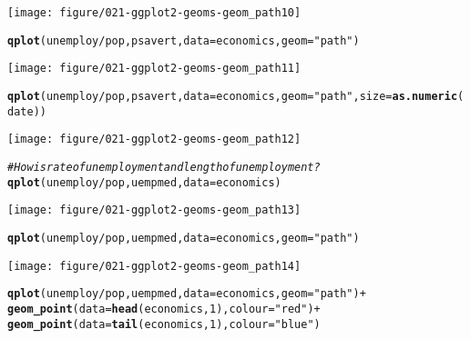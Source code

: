 \documentclass[a4paper,titlepage]{tufte-handout}\usepackage[]{graphicx}\usepackage[]{color}
\makeatletter
\def\maxwidth{ %
  \ifdim\Gin@nat@width>\linewidth
    \linewidth
  \else
    \Gin@nat@width
  \fi
}
\newcommand{\hlnum}[1]{\textcolor[rgb]{0.686,0.059,0.569}{#1}}%
\newcommand{\hlstr}[1]{\textcolor[rgb]{0.192,0.494,0.8}{#1}}%
\newcommand{\hlcom}[1]{\textcolor[rgb]{0.678,0.584,0.686}{\textit{#1}}}%
\newcommand{\hlopt}[1]{\textcolor[rgb]{0,0,0}{#1}}%
\newcommand{\hlstd}[1]{\textcolor[rgb]{0.345,0.345,0.345}{#1}}%
\newcommand{\hlkwc}[1]{\textcolor[rgb]{0.333,0.667,0.333}{#1}}%
\newcommand{\hlkwd}[1]{\textcolor[rgb]{0.737,0.353,0.396}{\textbf{#1}}}%
\newenvironment{kframe}{%
 \def\at@end@of@kframe{}%
 \ifinner\ifhmode%
  \def\at@end@of@kframe{\end{minipage}}%
  \begin{minipage}{\columnwidth}%
 \fi\fi%
 \def\FrameCommand##1{\hskip\@totalleftmargin \hskip-\fboxsep
 \colorbox{shadecolor}{##1}\hskip-\fboxsep
     \hskip-\linewidth \hskip-\@totalleftmargin \hskip\columnwidth}%
 \MakeFramed {\advance\hsize-\width
   \@totalleftmargin\z@ \linewidth\hsize
   \@setminipage}}%
 {\par\unskip\endMakeFramed%
 \at@end@of@kframe}
\newenvironment{knitrout}{}{} %
\makeatother
\begin{document}
\begin{knitrout}
\begin{kframe}
\begin{alltt}
\end{alltt}
\end{kframe}
\texttt{[image: figure/021-ggplot2-geoms-geom\_path10]} 
\begin{kframe}\begin{alltt}
\hlkwd{qplot}\hlstd{(unemploy}\hlopt{/}\hlstd{pop, psavert,} \hlkwc{data}\hlstd{=economics,} \hlkwc{geom}\hlstd{=}\hlstr{"path"}\hlstd{)}
\end{alltt}
\end{kframe}
\texttt{[image: figure/021-ggplot2-geoms-geom\_path11]} 
\begin{kframe}\begin{alltt}
\hlkwd{qplot}\hlstd{(unemploy}\hlopt{/}\hlstd{pop, psavert,} \hlkwc{data}\hlstd{=economics,} \hlkwc{geom}\hlstd{=}\hlstr{"path"}\hlstd{,} \hlkwc{size}\hlstd{=}\hlkwd{as.numeric}\hlstd{(date))}
\end{alltt}
\end{kframe}
\texttt{[image: figure/021-ggplot2-geoms-geom\_path12]} 
\begin{kframe}\begin{alltt}
\hlcom{# How is rate of unemployment and length of unemployment?}
\hlkwd{qplot}\hlstd{(unemploy}\hlopt{/}\hlstd{pop, uempmed,} \hlkwc{data}\hlstd{=economics)}
\end{alltt}
\end{kframe}
\texttt{[image: figure/021-ggplot2-geoms-geom\_path13]} 
\begin{kframe}\begin{alltt}
\hlkwd{qplot}\hlstd{(unemploy}\hlopt{/}\hlstd{pop, uempmed,} \hlkwc{data}\hlstd{=economics,} \hlkwc{geom}\hlstd{=}\hlstr{"path"}\hlstd{)}
\end{alltt}
\end{kframe}
\texttt{[image: figure/021-ggplot2-geoms-geom\_path14]} 
\begin{kframe}\begin{alltt}
\hlkwd{qplot}\hlstd{(unemploy}\hlopt{/}\hlstd{pop, uempmed,} \hlkwc{data}\hlstd{=economics,} \hlkwc{geom}\hlstd{=}\hlstr{"path"}\hlstd{)} \hlopt{+}
  \hlkwd{geom_point}\hlstd{(}\hlkwc{data}\hlstd{=}\hlkwd{head}\hlstd{(economics,} \hlnum{1}\hlstd{),} \hlkwc{colour}\hlstd{=}\hlstr{"red"}\hlstd{)} \hlopt{+}
  \hlkwd{geom_point}\hlstd{(}\hlkwc{data}\hlstd{=}\hlkwd{tail}\hlstd{(economics,} \hlnum{1}\hlstd{),} \hlkwc{colour}\hlstd{=}\hlstr{"blue"}\hlstd{)}
\end{alltt}
\end{kframe}

\end{knitrout}
\end{document}
